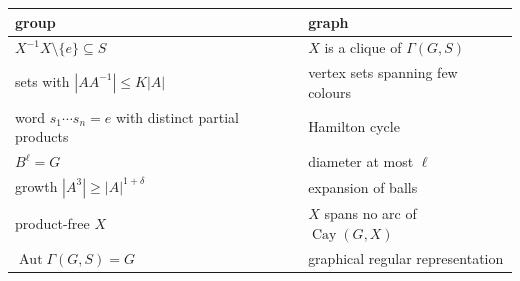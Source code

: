
\begin{center}
\renewcommand{\arraystretch}{1.25}
\small
\begin{tabular}{p{}p{}}
\textbf{group} & \textbf{graph}\\\hline
$X^{-1}X\setminus\{e\}\subseteq S$ & $X$ is a clique of $\Gamma(G,S)$\\
sets with $|AA^{-1}|\leq K|A|$ & vertex sets spanning few colours\\
word $s_1\cdots s_n=e$ with distinct partial products & Hamilton cycle\\
$B^\ell=G$ & diameter at most $\ell$\\
growth $|A^3|\geq|A|^{1+\delta}$ & expansion of balls\\
product-free $X$ & $X$ spans no arc of $\operatorname{Cay}(G,X)$\\
$\operatorname{Aut}\Gamma(G,S)=G$ & graphical regular representation
\end{tabular}
\end{center}
